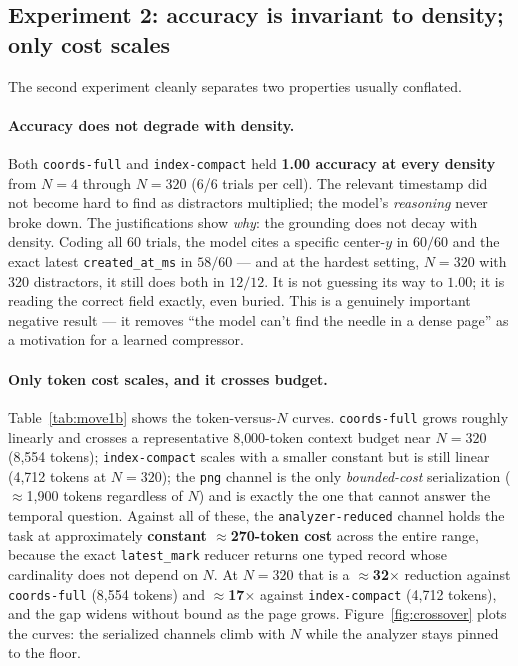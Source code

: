 \documentclass[11pt]{article}
\newcommand{\code}[1]{\texttt{#1}}
\begin{document}
\subsection{Experiment 2: accuracy is invariant to density; only cost scales}
\label{sec:move1b}

The second experiment cleanly separates two properties usually conflated.

\paragraph{Accuracy does not degrade with density.} Both \code{coords-full} and
\code{index-compact} held \textbf{1.00 accuracy at every density} from $N=4$
through $N=320$ (6/6 trials per cell). The relevant timestamp did not become hard
to find as distractors multiplied; the model's \emph{reasoning} never broke down.
The justifications show \emph{why}: the grounding does not decay with density.
Coding all 60 trials, the model cites a specific center-$y$ in $60/60$ and the
exact latest \code{created\_at\_ms} in $58/60$ --- and at the hardest setting,
$N=320$ with 320 distractors, it still does both in $12/12$. It is not guessing
its way to $1.00$; it is reading the correct field exactly, even buried. This is a
genuinely important negative result --- it removes ``the model can't find the
needle in a dense page'' as a motivation for a learned compressor.

\paragraph{Only token cost scales, and it crosses budget.}
Table~\ref{tab:move1b} shows the token-versus-$N$ curves. \code{coords-full}
grows roughly linearly and crosses a representative 8{,}000-token context budget
near $N=320$ (8{,}554 tokens); \code{index-compact} scales with a smaller
constant but is still linear (4{,}712 tokens at $N=320$); the \code{png} channel
is the only \emph{bounded-cost} serialization ($\approx$1{,}900 tokens
regardless of $N$) and is exactly the one that cannot answer the temporal
question. Against all of these, the \code{analyzer-reduced} channel holds the
task at approximately \textbf{constant $\approx$270-token cost} across the entire
range, because the exact \code{latest\_mark} reducer returns one typed record
whose cardinality does not depend on $N$. At $N=320$ that is a
\textbf{$\approx$32$\times$} reduction against \code{coords-full} (8{,}554 tokens)
and \textbf{$\approx$17$\times$} against \code{index-compact} (4{,}712 tokens),
and the gap widens without bound as the page grows. Figure~\ref{fig:crossover}
plots the curves: the serialized channels climb with $N$ while the analyzer stays
pinned to the floor.
\end{document}
